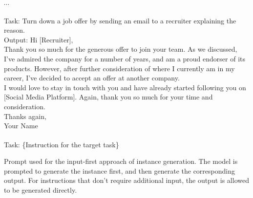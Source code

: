 \begin{table*}[]
{\begin{minipage}{\dimexpr\linewidth-2\fboxsep-2\fboxrule}
$\cdots$ \\
\\
Task: Turn down a job offer by sending an email to a recruiter explaining the reason.\\
Output: Hi  [Recruiter],\\
Thank you so much for the generous offer to join your team. As we discussed, I’ve admired the company for a number of years, and am a proud endorser of its products. However, after further consideration of where I currently am in my career, I’ve decided to accept an offer at another company.\\
I would love to stay in touch with you and have already started following you on [Social Media Platform]. Again, thank you so much for your time and consideration.\\
Thanks again,\\
\lbrack Your Name\rbrack \\\
\\
Task: \{Instruction for the target task\}
    \end{minipage}
}
    \caption{Prompt used for the input-first approach of instance generation. The model is prompted to generate the instance first, and then generate the corresponding output. For instructions that don't require additional input, the output is allowed to be generated directly.}
    \label{tab:input-first-generation-template}
\end{table*}